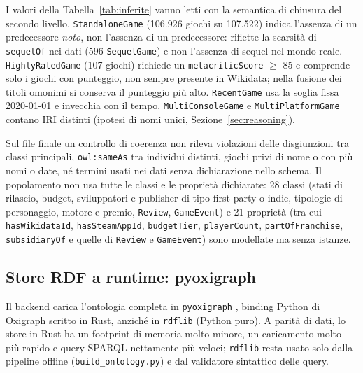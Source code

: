 I valori della Tabella~\ref{tab:inferite} vanno letti con la semantica di chiusura del secondo livello.
\texttt{StandaloneGame} (106.926 giochi su 107.522) indica l'assenza di un predecessore \emph{noto}, non
l'assenza di un predecessore: riflette la scarsit\`a di \texttt{sequelOf} nei dati (596 \texttt{SequelGame})
e non l'assenza di sequel nel mondo reale. \texttt{HighlyRatedGame} (107 giochi) richiede un
\texttt{metacriticScore} $\geq$ 85 e comprende solo i giochi con punteggio, non sempre presente in
Wikidata; nella fusione dei titoli omonimi si conserva il punteggio pi\`u alto. \texttt{RecentGame} usa la
soglia fissa 2020-01-01 e invecchia con il tempo. \texttt{MultiConsoleGame} e \texttt{MultiPlatformGame}
contano IRI distinti (ipotesi di nomi unici, Sezione~\ref{sec:reasoning}).


Sul file finale un controllo di coerenza non rileva violazioni delle disgiunzioni tra classi principali,
\texttt{owl:sameAs} tra individui distinti, giochi privi di nome o con pi\`u nomi o date, n\'e termini usati
nei dati senza dichiarazione nello schema. Il popolamento non usa tutte le classi e le propriet\`a
dichiarate: 28 classi (stati di rilascio, budget, sviluppatori e publisher di tipo first-party o indie,
tipologie di personaggio, motore e premio, \texttt{Review}, \texttt{GameEvent}) e 21 propriet\`a
(tra cui \texttt{hasWikidataId}, \texttt{hasSteamAppId}, \texttt{budgetTier}, \texttt{playerCount},
\texttt{partOfFranchise}, \texttt{subsidiaryOf} e quelle di \texttt{Review} e \texttt{GameEvent}) sono
modellate ma senza istanze.

\subsection{Store RDF a runtime: pyoxigraph}

Il backend carica l'ontologia completa in \texttt{pyoxigraph} \citep{pyoxigraph}, binding Python
di Oxigraph scritto in Rust, anzich\'e in \texttt{rdflib} (Python puro). A parit\`a di dati, lo store
in Rust ha un footprint di memoria molto minore, un caricamento molto pi\`u rapido e query SPARQL
nettamente pi\`u veloci; \texttt{rdflib} resta usato solo dalla pipeline offline
(\texttt{build\_ontology.py}) e dal validatore sintattico delle query.
